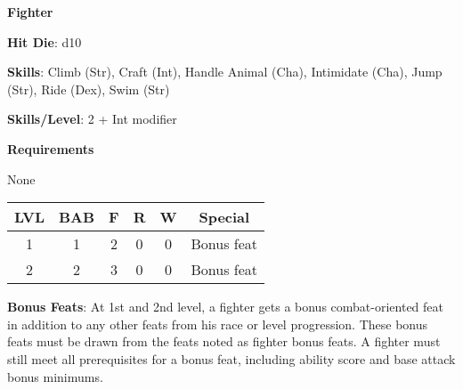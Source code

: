 \textbf{\huge{Fighter}}

\textbf{Hit Die}: d10

\textbf{Skills}: Climb (Str), Craft (Int), Handle Animal (Cha), Intimidate (Cha), Jump (Str), Ride (Dex), Swim (Str)

\textbf{Skills/Level}: 2 + Int modifier

\textbf{\large{Requirements}}

None

\begin{center}
\begin{adjustwidth}{-4cm}{}
\begin{small}
\begin{tabular}{| c | c | c | c | c | c |}
\hline
LVL &BAB &F &R &W &Special \\
\hline
1 &1 &2 &0 &0 &Bonus feat \\
2 &2 &3 &0 &0 &Bonus feat \\
\hline
\end{tabular}
\end{small}
\end{adjustwidth}
\end{center}

\textbf{Bonus Feats}: At 1st and 2nd level, a fighter gets a bonus combat-oriented feat in addition to any other feats from his race or level progression. These bonus feats must be drawn from the feats noted as fighter bonus feats. A fighter must still meet all prerequisites for a bonus feat, including ability score and base attack bonus minimums.

